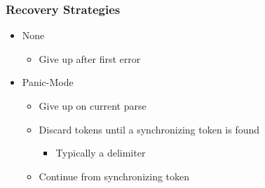 \documentclass[usepdftitle=false,professionalfonts,compress ]{beamer}
\begin{document}
{
\begin{frame}\frametitle{Recovery Strategies}

	\begin{itemize}
	\item None

	\begin{itemize}
	\item Give up after first error
				\end{itemize}

			\item Panic-Mode

	\begin{itemize}
	\item Give up on current parse
			\item Discard tokens until a synchronizing token is found

	\begin{itemize}
	\item Typically a delimiter
				\end{itemize}

			\item Continue from synchronizing token
				\end{itemize}

				\end{itemize}

\end{frame}}
\end{document}
